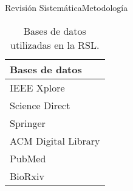 \documentclass[10pt]{beamer}
\newcommand{\1}{
	\setbeamertemplate{background}{
		\texttt{[image: img/1]}
		\tikz[overlay] \fill[fill opacity=0.75,fill=white] (0,0) rectangle (-\paperwidth,\paperheight);
	}
}
\begin{document}
\begin{frame}{Revisión Sistemática}{Metodología}
	
	\begin{table}[H]
		\centering
		\begin{center}
			\caption{Bases de datos utilizadas en la RSL.}
			\label{tab:bd_RSL}
			\setlength{\tabcolsep}{0.5em} %
			{\renewcommand{\arraystretch}{1.2}%
				\begin{tabular}{p{3cm}}
					\textbf{Bases de datos} \\ \hline
					IEEE Xplore                                                                               \\
					Science Direct \\				
					Springer          \\
					ACM Digital Library                                                                                                             \\	
					PubMed \\ 
					BioRxiv \\ 	
				\end{tabular}
			}
		\end{center}
	\end{table}
	
\end{frame}
\end{document}
